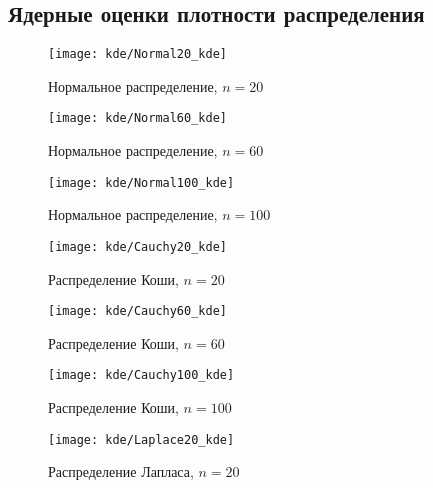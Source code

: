 \subsection{Ядерные оценки плотности распределения}

\begin{figure}[H]
	\begin{center}
		\texttt{[image: kde/Normal20\_kde]}
		\caption{Нормальное распределение, $n=20$} 
		\label{pic:pic_name} 
	\end{center}
\end{figure}

\begin{figure}[H]
	\begin{center}
		\texttt{[image: kde/Normal60\_kde]}
		\caption{Нормальное распределение, $n=60$} 
		\label{pic:pic_name} 
	\end{center}
\end{figure}

\begin{figure}[H]
	\begin{center}
		\texttt{[image: kde/Normal100\_kde]}
		\caption{Нормальное распределение, $n=100$} 
		\label{pic:pic_name} 
	\end{center}
\end{figure}

\begin{figure}[H]
	\begin{center}
		\texttt{[image: kde/Cauchy20\_kde]}
		\caption{Распределение Коши, $n=20$} 
		\label{pic:pic_name} 
	\end{center}
\end{figure}

\begin{figure}[H]
	\begin{center}
		\texttt{[image: kde/Cauchy60\_kde]}
		\caption{Распределение Коши, $n=60$} 
		\label{pic:pic_name} 
	\end{center}
\end{figure}

\begin{figure}[H]
	\begin{center}
		\texttt{[image: kde/Cauchy100\_kde]}
		\caption{Распределение Коши, $n=100$} 
		\label{pic:pic_name} 
	\end{center}
\end{figure}

\begin{figure}[H]
	\begin{center}
		\texttt{[image: kde/Laplace20\_kde]}
		\caption{Распределение Лапласа, $n=20$} 
		\label{pic:pic_name} 
	\end{center}
\end{figure}

